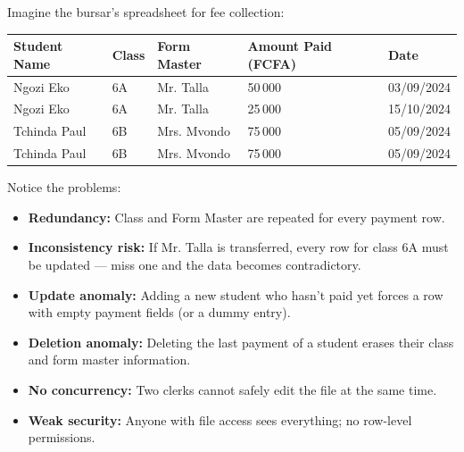 \documentclass[11pt]{article}
\begin{document}
\begin{experience}
Imagine the bursar's spreadsheet for fee collection:

\begin{center}
\begin{tabularx}{\linewidth}{|l|X|X|X|X|}\hline
\rowcolor{popblueL}
\textbf{Student Name} & \textbf{Class} & \textbf{Form Master} & \textbf{Amount Paid (FCFA)} & \textbf{Date} \\ \hline
Ngozi Eko & 6A & Mr. Talla & 50\,000 & 03/09/2024 \\
Ngozi Eko & 6A & Mr. Talla & 25\,000 & 15/10/2024 \\
Tchinda Paul & 6B & Mrs. Mvondo & 75\,000 & 05/09/2024 \\
Tchinda Paul & 6B & Mrs. Mvondo & 75\,000 & 05/09/2024 \\ \hline
\end{tabularx}
\end{center}

\noindent Notice the problems:
\begin{itemize}
    \item \textbf{Redundancy:} Class and Form Master are repeated for every payment row.
    \item \textbf{Inconsistency risk:} If Mr. Talla is transferred, every row for class 6A must be updated — miss one and the data becomes contradictory.
    \item \textbf{Update anomaly:} Adding a new student who hasn't paid yet forces a row with empty payment fields (or a dummy entry).
    \item \textbf{Deletion anomaly:} Deleting the last payment of a student erases their class and form master information.
    \item \textbf{No concurrency:} Two clerks cannot safely edit the file at the same time.
    \item \textbf{Weak security:} Anyone with file access sees everything; no row-level permissions.
\end{itemize}
\end{experience}
\end{document}
